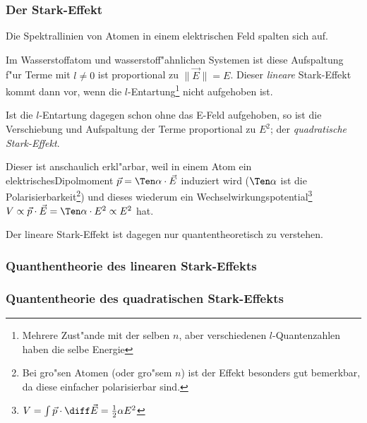 \documentclass[a4paper,draft]{article}
\begin{document}
\subsubsection{Der Stark-Effekt}
\label{sec:der_stark_effekt}

\begin{Erfahrung}
Die Spektrallinien von Atomen in einem elektrischen Feld  spalten
sich auf.
\end{Erfahrung}

Im Wasserstoffatom und wasserstoff"ahnlichen Systemen ist diese
Aufspaltung f"ur Terme mit $l \neq 0$ ist proportional zu  $\| \vec
E\| = E$. Dieser \emph{lineare} Stark-Effekt kommt dann vor, wenn die
$l$-Entartung\footnote{Mehrere Zust"ande mit der selben $n$, aber
  verschiedenen $l$-Quantenzahlen haben die selbe Energie} nicht
aufgehoben ist.

Ist die $l$-Entartung dagegen schon ohne das E-Feld aufgehoben, so ist
die Verschiebung und Aufspaltung der Terme proportional zu $E^2$; der
\emph{quadratische Stark-Effekt}. 

Dieser ist anschaulich erkl"arbar, weil in einem Atom ein
elektrischesDipolmoment $\vec p = \Ten \alpha \cdot \vec E$ induziert
wird ($\Ten \alpha$ ist die Polarisierbarkeit\footnote{Bei gro"sen
  Atomen (oder gro"sem $n$) ist der Effekt besonders gut bemerkbar, da
  diese einfacher polarisierbar sind.  }) und dieses wiederum ein
Wechselwirkungspotential\footnote{$V = \int \vec p \cdot \diff \vec E
  = \frac{1}{2} \alpha E^2$} $V \propto \vec p \cdot \vec E = \Ten \alpha
\cdot E^2 \propto E^2$ hat.

Der lineare Stark-Effekt ist dagegen nur quantentheoretisch zu
verstehen.




\subsubsection{Quanthentheorie des linearen Stark-Effekts}
\label{sec:quanth_des_line_stark_effekts}




\subsubsection{Quantentheorie des quadratischen Stark-Effekts}
\label{sec:quant_des_quadr_stark_effekts}
\end{document}
